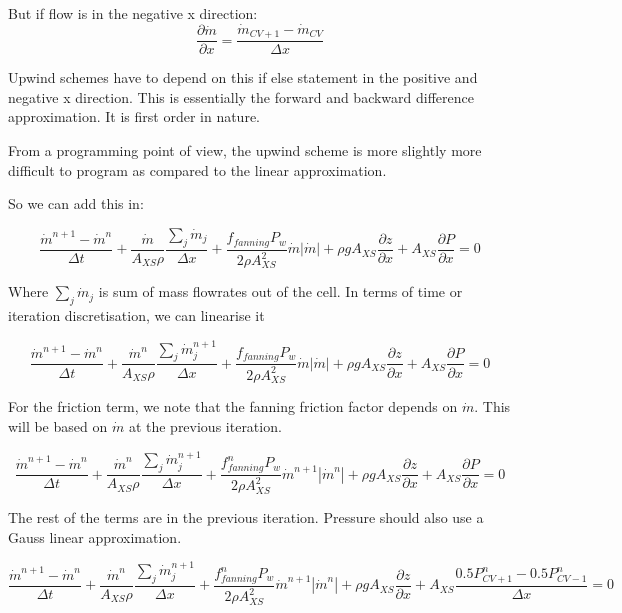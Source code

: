 \documentclass[masters]{ucbthesis}
\renewcommand{\_}{\kern-1.5pt\textunderscore\kern-1.5pt}
\begin{document}
But if flow is in the negative x direction:
\begin{equation*}
	\frac{\partial \dot{m}}{\partial x}  
	= \frac{\dot{m}_{CV+1} - \dot{m}_{CV}}{\Delta x}  
\end{equation*}

Upwind schemes have to depend on this if else statement in the positive 
and negative x direction. This is essentially the forward and backward 
difference approximation. It is first order in nature.

From a programming point of view, the upwind scheme is more slightly more 
difficult to program as compared to the linear approximation.

So we can add this in:

\begin{equation*} 
	\frac{\dot{m}^{n+1} - \dot{m}^n}{\Delta t}
	+ \frac{\dot{m}}{A_{XS} \rho} \frac{\sum_j \dot{m}_j}{\Delta x} 
	+\frac{f_{fanning} P_w}{2 \rho A_{XS}^2} \dot{m} |\dot{m}|
	+ \rho g A_{XS} \frac{\partial z}{\partial x}
	+ A_{XS} \frac{\partial P}{\partial x} = 0
\end{equation*}

Where $\sum_j \dot{m}_j$ is sum of mass flowrates out of the cell.
In terms of time or iteration discretisation, we can linearise it

\begin{equation*} 
	\frac{\dot{m}^{n+1} - \dot{m}^n}{\Delta t}
	+ \frac{\dot{m}^n}{A_{XS} \rho} \frac{\sum_j \dot{m}_j^{n+1}}{\Delta x} 
	+\frac{f_{fanning} P_w}{2 \rho A_{XS}^2} \dot{m} |\dot{m}|
	+ \rho g A_{XS} \frac{\partial z}{\partial x}
	+ A_{XS} \frac{\partial P}{\partial x} = 0
\end{equation*}

For the friction term, we note that the fanning friction factor depends 
on $\dot{m}$. This will be based on $\dot{m}$ at the previous iteration.


\begin{equation*} 
	\frac{\dot{m}^{n+1} - \dot{m}^n}{\Delta t}
	+ \frac{\dot{m}^n}{A_{XS} \rho} \frac{\sum_j \dot{m}_j^{n+1}}{\Delta x} 
	+\frac{f_{fanning}^n P_w}{2 \rho A_{XS}^2} \dot{m}^{n+1} |\dot{m}^n|
	+ \rho g A_{XS} \frac{\partial z}{\partial x}
	+ A_{XS} \frac{\partial P}{\partial x} = 0
\end{equation*}

The rest of the terms are in the previous iteration. Pressure should also 
use a Gauss linear approximation.


\begin{equation*} 
	\frac{\dot{m}^{n+1} - \dot{m}^n}{\Delta t}
	+ \frac{\dot{m}^n}{A_{XS} \rho} \frac{\sum_j \dot{m}_j^{n+1}}{\Delta x} 
	+\frac{f_{fanning}^n P_w}{2 \rho A_{XS}^2} \dot{m}^{n+1} |\dot{m}^n|
	+ \rho g A_{XS} \frac{\partial z}{\partial x}
	+ A_{XS} \frac{0.5 P^{n}_{CV+1}-0.5P^n_{CV-1}}{\Delta x} = 0
\end{equation*}
\end{document}
